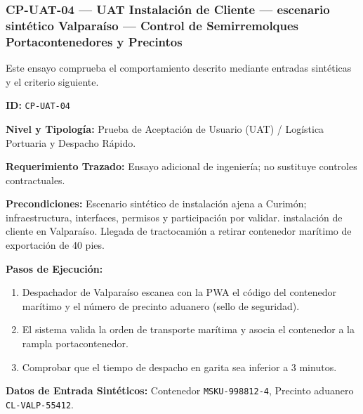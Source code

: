 \subsubsection*{CP-UAT-04 — UAT Instalación de Cliente — escenario sintético Valparaíso — Control de Semirremolques Portacontenedores y Precintos}\label{sec:9-cp-uat-04}
Este ensayo comprueba el comportamiento descrito mediante entradas sintéticas y el criterio siguiente.

\par\noindent\textbf{ID:} \texttt{C\allowbreak{}P\allowbreak{}-\allowbreak{}U\allowbreak{}A\allowbreak{}T\allowbreak{}-\allowbreak{}0\allowbreak{}4\allowbreak{}}\par
\par\noindent\textbf{Nivel y Tipología:} Prueba de Aceptación de Usuario (UAT) / Logística Portuaria y Despacho Rápido.\par
\par\noindent\textbf{Requerimiento Trazado:} Ensayo adicional de ingeniería; no sustituye controles contractuales.\par
\par\noindent\textbf{Precondiciones:} Escenario sintético de instalación ajena a Curimón; infraestructura, interfaces, permisos y participación por validar.  instalación de cliente en Valparaíso. Llegada de tractocamión a retirar contenedor marítimo de exportación de 40 pies.\par
\par\noindent\textbf{Pasos de Ejecución:} \par
\begin{enumerate}
\item Despachador de Valparaíso escanea con la PWA el código del contenedor marítimo y el número de precinto aduanero (sello de seguridad).
\item El sistema valida la orden de transporte marítima y asocia el contenedor a la rampla portacontenedor.
\item Comprobar que el tiempo de despacho en garita sea inferior a 3 minutos.
\end{enumerate}
\par\noindent\textbf{Datos de Entrada Sintéticos:} Contenedor \texttt{M\allowbreak{}S\allowbreak{}K\allowbreak{}U\allowbreak{}-\allowbreak{}9\allowbreak{}9\allowbreak{}8\allowbreak{}8\allowbreak{}1\allowbreak{}2\allowbreak{}-\allowbreak{}4\allowbreak{}}, Precinto aduanero \texttt{C\allowbreak{}L\allowbreak{}-\allowbreak{}V\allowbreak{}A\allowbreak{}L\allowbreak{}P\allowbreak{}-\allowbreak{}5\allowbreak{}5\allowbreak{}4\allowbreak{}1\allowbreak{}2\allowbreak{}}.\par
